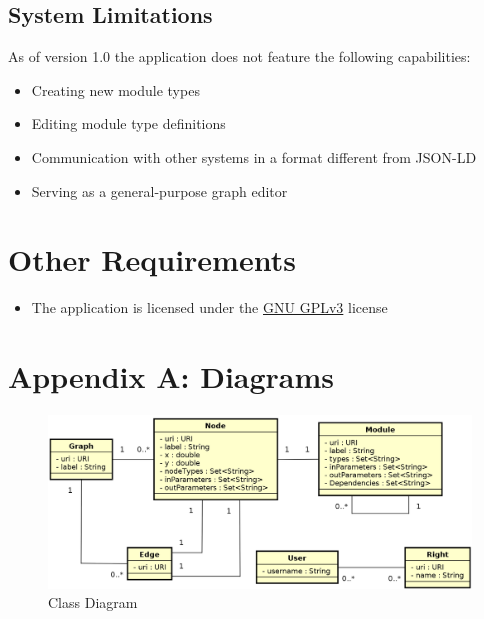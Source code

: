 \documentclass{article}
\begin{document}
\subsection{System Limitations}
As of version 1.0 the application does not feature the following capabilities:
\begin{itemize}
    \item Creating new module types
    \item Editing module type definitions
    \item Communication with other systems in a format different from JSON-LD
    \item Serving as a general-purpose graph editor
\end{itemize}
	\section{Other Requirements}
	\begin{itemize}
	    \item The application is licensed under the \href{https://www.gnu.org/licenses/gpl.txt}{GNU GPLv3} license
	\end{itemize}
	\section*{Appendix A: Diagrams}
	\begin{figure}[h!]
	    \includegraphics[width=\textwidth]{ClassDiagram.png}
	    \caption{Class Diagram}
	\end{figure}
\end{document}
